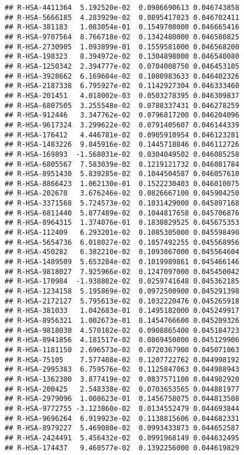 \documentclass[
]{article}
\begin{document}
\begin{verbatim}
## R-HSA-4411364  5.192520e-02  0.0986690613 0.046743858
## R-HSA-5666185  4.283929e-02  0.0895417023 0.046702411
## R-HSA-381183   1.083054e-01  0.1549708000 0.046665416
## R-HSA-9707564  8.766718e-02  0.1342480000 0.046580825
## R-HSA-2730905  1.093899e-01  0.1559581000 0.046568200
## R-HSA-198323   8.394972e-02  0.1304898000 0.046540080
## R-HSA-1250342  2.394777e-02  0.0704008750 0.046453105
## R-HSA-3928662  6.169604e-02  0.1080983633 0.046402326
## R-HSA-2187338  6.795927e-02  0.1142927304 0.046333460
## R-HSA-201451   4.018002e-03  0.0503278395 0.046309837
## R-HSA-6807505  3.255548e-02  0.0788337431 0.046278259
## R-HSA-912446   3.347762e-02  0.0796817200 0.046204096
## R-HSA-9617324  3.299622e-02  0.0791405607 0.046144339
## R-HSA-176412   4.446781e-02  0.0905910954 0.046123281
## R-HSA-1483226  9.845916e-02  0.1445718846 0.046112726
## R-HSA-169893  -1.568031e-02  0.0304049502 0.046085258
## R-HSA-6805567  7.583039e-02  0.1219121732 0.046081784
## R-HSA-8951430  5.839285e-02  0.1044504587 0.046057610
## R-HSA-8866423  1.062130e-01  0.1522230403 0.046010075
## R-HSA-202670   3.676246e-02  0.0826667100 0.045904250
## R-HSA-3371568  5.724573e-02  0.1031429000 0.045897168
## R-HSA-6811440  5.877489e-02  0.1044817658 0.045706876
## R-HSA-8964315  1.374076e-01  0.1830829525 0.045675353
## R-HSA-112409   6.293201e-02  0.1085305000 0.045598490
## R-HSA-5654736  6.018027e-02  0.1057492255 0.045568956
## R-HSA-450282   6.382210e-02  0.1093867000 0.045564604
## R-HSA-1489509  5.653284e-02  0.1019989861 0.045466146
## R-HSA-9818027  7.925966e-02  0.1247097000 0.045450042
## R-HSA-170984  -1.938802e-02  0.0259741648 0.045362185
## R-HSA-1234158  5.195869e-02  0.0972500900 0.045291398
## R-HSA-2172127  5.795613e-02  0.1032220476 0.045265918
## R-HSA-381033   1.042683e-01  0.1495182000 0.045249917
## R-HSA-8956321  1.002673e-01  0.1454766600 0.045209326
## R-HSA-9818030  4.570182e-02  0.0908865400 0.045184723
## R-HSA-8941856  4.181517e-02  0.0869450800 0.045129906
## R-HSA-1181150  2.696573e-02  0.0720367900 0.045071063
## R-HSA-75105    7.577408e-02  0.1207722762 0.044998192
## R-HSA-2995383  6.759576e-02  0.1125847063 0.044988943
## R-HSA-1362300  3.877419e-02  0.0837571100 0.044982920
## R-HSA-200425   2.548338e-02  0.0703653565 0.044881977
## R-HSA-2979096  1.008623e-01  0.1456758075 0.044813508
## R-HSA-9772755 -3.123860e-02  0.0134552479 0.044693844
## R-HSA-9696264  6.919923e-02  0.1138815606 0.044682331
## R-HSA-8979227  5.469080e-02  0.0993433873 0.044652587
## R-HSA-2424491  5.456432e-02  0.0991968149 0.044632495
## R-HSA-174437   9.460577e-02  0.1392256000 0.044619829

\end{verbatim}
\end{document}
